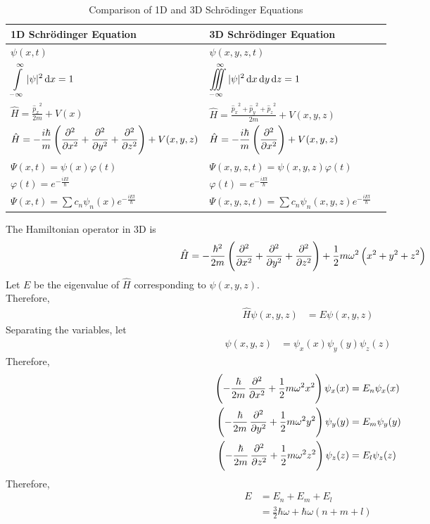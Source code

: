 \documentclass[titlepage, fleqn, a4paper, 12pt, twoside]{article}
\theoremstyle{definition}
\theoremstyle{theorem}
\begin{document}
\begin{table}[h]
	\centering
	\begin{tabular}{l l l}
		\toprule
		1D Schrödinger Equation & 3D Schrödinger Equation\\
		\midrule
		$\displaystyle \psi(x,t)$ & $\displaystyle \psi(x,y,z,t)$\\
		$\displaystyle \int\limits_{-\infty}^{\infty} |\psi|^2 \dif x = 1$ & $\displaystyle \iiint\limits_{-\infty}^{\infty} |\psi|^2 \dif x \dif y \dif z = 1$\\
		$\displaystyle \hat{H} = \frac{{\hat{p}_x}^2}{2 m} + V(x)$ & $\displaystyle \hat{H} = \frac{{\hat{p}_x}^2 + {\hat{p}_y}^2 + {\hat{p}_z}^2}{2 m} + V(x,y,z)$\\
		$\displaystyle \hat{H} = -\frac{i \hbar}{m} \left( \dpd[2]{}{x} + \dpd[2]{}{y} + \dpd[2]{}{z} \right) + V(x,y,z)$ & $\displaystyle \hat{H} = -\frac{i \hbar}{m} \left( \dpd[2]{}{x} \right) + V(x,y,z)$\\
		$\Psi(x,t) = \psi(x) \varphi(t)$ & $\Psi(x,y,z,t) = \psi(x,y,z) \varphi(t)$\\
		$\varphi(t) = e^{-\frac{i E t}{\hbar}}$ & $\varphi(t) = e^{-\frac{i E t}{\hbar}}$\\
		$\Psi(x,t) = \sum c_n \psi_n(x) e^{-\frac{i E t}{\hbar}}$ & $\Psi(x,y,z,t) = \sum c_n \psi_n(x,y,z) e^{-\frac{i E t}{\hbar}}$\\
		\bottomrule
	\end{tabular}
	\caption{Comparison of 1D and 3D Schrödinger Equations}
	\label{tab:Comparison_of_1D_and_3D_Schrodinger_Equations}
\end{table}

The Hamiltonian operator in 3D is
\begin{align*}
	\hat{H} &= -\frac{\hbar^2}{2 m} \left( \dpd[2]{}{x} + \dpd[2]{}{y} + \dpd[2]{}{z} \right) + \frac{1}{2} m \omega^2 \left( x^2 + y^2 + z^2 \right)
\end{align*}
Let $E$ be the eigenvalue of $\hat{H}$ corresponding to $\psi(x,y,z)$.\\
Therefore,
\begin{align*}
	\hat{H} \psi(x,y,z) &= E \psi(x,y,z)
\end{align*}
Separating the variables, let
\begin{align*}
	\psi(x,y,z) &= \psi_x(x) \psi_y(y) \psi_z(z)
\end{align*}
Therefore,
\begin{align*}
	\left( -\frac{\hbar}{2 m} \dpd[2]{}{x} + \frac{1}{2} m \omega^2 x^2 \right) \psi_x(x) &= E_n \psi_x(x)\\
	\left( -\frac{\hbar}{2 m} \dpd[2]{}{y} + \frac{1}{2} m \omega^2 y^2 \right) \psi_y(y) &= E_m \psi_y(y)\\
	\left( -\frac{\hbar}{2 m} \dpd[2]{}{z} + \frac{1}{2} m \omega^2 z^2 \right) \psi_z(z) &= E_l \psi_z(z)
\end{align*}
Therefore,
\begin{align*}
	E &= E_n + E_m + E_l\\
	&= \frac{3}{2} \hbar \omega + \hbar \omega (n + m + l)
\end{align*}
\end{document}
